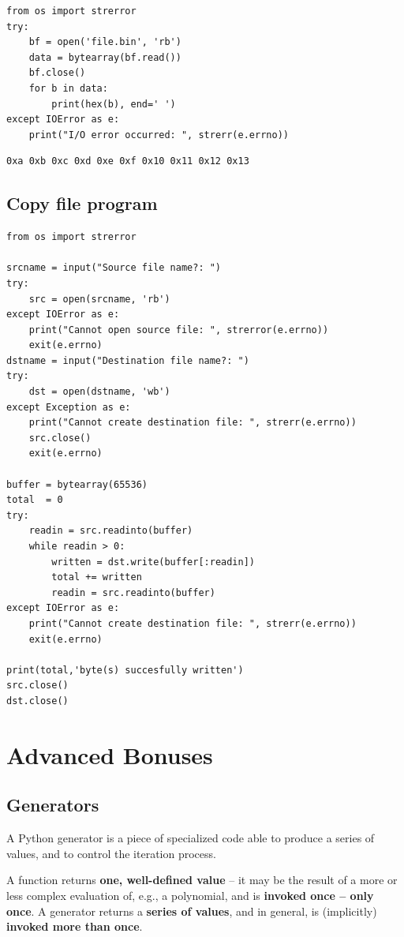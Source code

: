 \documentclass[11pt]{article}
\begin{document}
\begin{verbatim}
from os import strerror
try:
	bf = open('file.bin', 'rb')
	data = bytearray(bf.read())
	bf.close()
	for b in data:
		print(hex(b), end=' ')
except IOError as e:
	print("I/O error occurred: ", strerr(e.errno))
\end{verbatim}

\begin{verbatim}
0xa 0xb 0xc 0xd 0xe 0xf 0x10 0x11 0x12 0x13 
\end{verbatim}

\newpage

\subsection{Copy file program}
\label{sec:org7a0dbb8}

\begin{verbatim}
from os import strerror

srcname = input("Source file name?: ")
try:
	src = open(srcname, 'rb')
except IOError as e:
	print("Cannot open source file: ", strerror(e.errno))
	exit(e.errno)	
dstname = input("Destination file name?: ")
try:
	dst = open(dstname, 'wb')
except Exception as e:
	print("Cannot create destination file: ", strerr(e.errno))
	src.close()
	exit(e.errno)	

buffer = bytearray(65536)
total  = 0
try:
	readin = src.readinto(buffer)
	while readin > 0:
		written = dst.write(buffer[:readin])
		total += written
		readin = src.readinto(buffer)
except IOError as e:
	print("Cannot create destination file: ", strerr(e.errno))
	exit(e.errno)	

print(total,'byte(s) succesfully written')
src.close()
dst.close()
\end{verbatim}

\newpage

\section{Advanced Bonuses}
\label{sec:org7b4f972}
\subsection{Generators}
\label{sec:org55d656c}
A Python generator is a piece of specialized code able to produce a
series of values, and to control the iteration process.

A function returns \textbf{one, well-defined value} – it may be the result of
a more or less complex evaluation of, e.g., a polynomial, and is
\textbf{invoked once – only once}.  A generator returns a \textbf{series of values}, and
in general, is (implicitly) \textbf{invoked more than once}.
\end{document}
